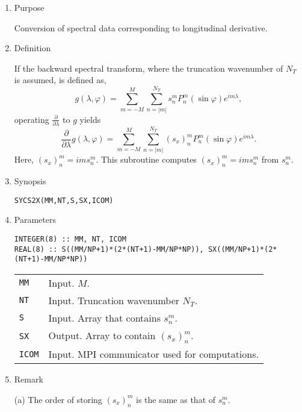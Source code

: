 \documentclass[a4paper]{scrartcl}
\begin{document}
\begin{enumerate}

\item Purpose

Conversion of spectral data 
corresponding to longitudinal derivative.

\item Definition

If the backward spectral transform, where the truncation
wavenumber of $N_T$ is assumed, is defined as,
\begin{equation}
g(\lambda,\varphi)=\sum^M_{m=-M}\sum^{N_T}_{n=|m|}
s^m_nP^m_n(\sin\varphi)e^{im\lambda},
\end{equation}
operating $\frac{\partial}{\partial\lambda}$ to $g$
yields
\begin{equation}
\frac{\partial}{\partial\lambda}
g(\lambda,\varphi)=\sum^M_{m=-M}\sum^{N_T}_{n=|m|}
(s_x)^m_nP^m_n(\sin\varphi)e^{im\lambda}.
\end{equation}
Here, $(s_x)^m_n=ims^m_n$.
This subroutine computes $(s_x)^m_n=ims^m_n$ from $s^m_n$.

\item Synopsis 

\texttt{SYCS2X(MM,NT,S,SX,ICOM)}
  
\item Parameters

\begin{verbatim}
INTEGER(8) :: MM, NT, ICOM
REAL(8) :: S((MM/NP+1)*(2*(NT+1)-MM/NP*NP)), SX((MM/NP+1)*(2*(NT+1)-MM/NP*NP))
\end{verbatim}

\begin{tabular}{ll}
\texttt{MM} & Input. $M$.\\  
\texttt{NT} & Input. Truncation wavenumber $N_T$.\\
\texttt{S} & Input. Array that contains $s^m_n$.\\
\texttt{SX} & Output. Array to contain $(s_x)^m_n$.\\
\texttt{ICOM} & Input. MPI communicator used for computations.
\end{tabular}

\item Remark

(a) The order of storing $(s_x)^m_n$ is the same as that of $s^m_n$.    
    
\end{enumerate}

\end{document}
